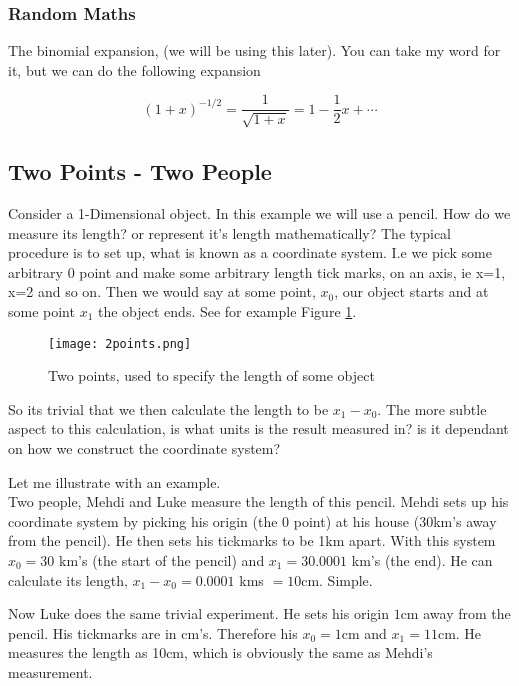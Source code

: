 \subsubsection{Random Maths}
The binomial expansion, (we will be using this later). You can take my word for it, but we can do the following expansion

\begin{equation}
  (1 + x)^{-1/2} = \frac{1}{\sqrt{1 +x}} = 1 - \frac{1}{2}x + \cdots
  \label{eq:binom}
\end{equation}



\subsection{Two Points - Two People}

Consider a 1-Dimensional object. In this example we will use a pencil. How do we measure its length? or represent it's length mathematically? The typical procedure is to set up, what is known as a coordinate system. I.e we pick some arbitrary 0 point and make some arbitrary length tick marks, on an axis, ie x=1, x=2 and so on. Then we would say at some point, $x_0$, our object starts and at some point $x_1$ the object ends. See for example Figure \ref{fig:pp}. 

\begin{figure}[h]
  \centering
  \texttt{[image: 2points.png]}
  \caption{Two points, used to specify the length of some object}
  \label{fig:pp}
\end{figure}

So its trivial that we then calculate the length to be $x_1 - x_0$. The more subtle aspect to this calculation, is what units is the result measured in? is it dependant on how we construct the coordinate system? 

Let me illustrate with an example. \\

Two people, Mehdi and Luke measure the length of this pencil. Mehdi sets up his coordinate system by picking his origin (the 0 point) at his house (30km's away from the pencil). He then sets his tickmarks to be 1km apart. With this system $x_0 = 30$ km's (the start of the pencil) and $x_1 = 30.0001$ km's (the end).  He can calculate its length, $x_1 - x_0 = 0.0001$ kms $ = 10$cm. Simple. 

Now Luke does the same trivial experiment. He sets his origin $1$cm away from the pencil. His tickmarks are in cm's. Therefore his $x_0 = 1$cm and $x_1 = 11$cm. He measures the length as 10cm, which is obviously the same as Mehdi's measurement. 

